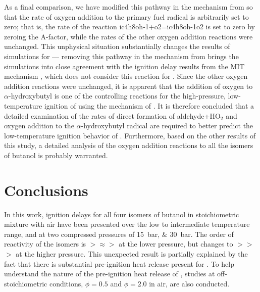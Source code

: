 \documentclass[../main.tex]{subfiles}
\begin{document}
As a final comparison, we have modified this pathway in the mechanism from
\textcite{Sarathy2012} so that the rate of oxygen addition to the primary
fuel radical is arbitrarily set to zero; that is, the rate of the reaction
ic4h8oh-1+o2=ic4h8oh-1o2 is set to zero by zeroing the $\mathrm{A}$-factor, while the
rates of the other oxygen addition reactions were unchanged. This unphysical
situation substantially changes the results of simulations for
\iBuOH{} --- removing this pathway in the mechanism from
\textcite{Sarathy2012} brings the simulations into close agreement with the
ignition delay results from the MIT mechanism \cite{Hansen2013,Merchant2013},
which does not consider this reaction for \iBuOH{}. Since the other
oxygen addition reactions were unchanged, it is apparent that the addition of
oxygen to $\alpha$-hydroxybutyl is one of the controlling reactions for the
high-pressure, low-temperature ignition of \iBuOH{} using the
mechanism of \textcite{Sarathy2012}. It is therefore concluded that a detailed
examination of the rates of direct formation of aldehyde+HO$_2$ and oxygen
addition to the $\alpha$-hydroxybutyl radical are required to better predict
the low-temperature ignition behavior of \iBuOH{}. Furthermore, based
on the other results of this study, a detailed analysis of the oxygen addition
reactions to all the isomers of butanol is probably warranted.

\section{Conclusions}
\label{sec:buoh-conclusions}

In this work, ignition delays for all four isomers of butanol in stoichiometric
mixture with air have been presented over the low to intermediate temperature
range, and at two compressed pressures of \SIlist{15;30}{\bar}. The order of
reactivity of the isomers is \nBuOH{}$>$\sBuOH{}$\approx$\iBuOH{}$>$\tBuOH{}
at the lower pressure, but changes to \nBuOH{}$>$\tBuOH{}$>$\sBuOH{}$>$\iBuOH{}
at the higher pressure. This unexpected result is partially explained by
the fact that there is substantial pre-ignition heat release present
for \tBuOH{}. To help understand the nature of the pre-ignition heat
release of \tBuOH{}, studies at off-stoichiometric conditions,
$\phi=\num{0.5}$ and $\phi=\num{2.0}$ in air, are also conducted.
\end{document}
